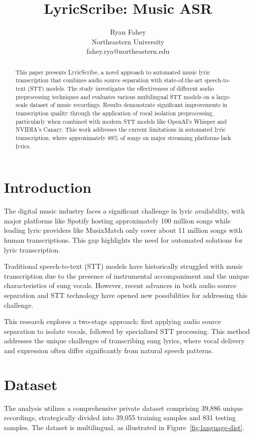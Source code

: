 \documentclass[10pt]{article}
\title{\textbf{LyricScribe: Music ASR}}
\author{Ryan Fahey\\
\small{Northeastern University}\\
\small{fahey.rya@northeastern.edu}}
\date{}
\begin{document}
\maketitle

\begin{abstract}
\noindent This paper presents LyricScribe, a novel approach to automated music lyric transcription that combines audio source separation with state-of-the-art speech-to-text (STT) models. The study investigates the effectiveness of different audio preprocessing techniques and evaluates various multilingual STT models on a large-scale dataset of music recordings. Results demonstrate significant improvements in transcription quality through the application of vocal isolation preprocessing, particularly when combined with modern STT models like OpenAI's Whisper and NVIDIA's Canary. This work addresses the current limitations in automated lyric transcription, where approximately 89\% of songs on major streaming platforms lack lyrics.
\end{abstract}

\section{Introduction}
The digital music industry faces a significant challenge in lyric availability, with major platforms like Spotify hosting approximately 100 million songs while leading lyric providers like MusixMatch only cover about 11 million songs with human transcriptions. This gap highlights the need for automated solutions for lyric transcription.

Traditional speech-to-text (STT) models have historically struggled with music transcription due to the presence of instrumental accompaniment and the unique characteristics of sung vocals. However, recent advances in both audio source separation and STT technology have opened new possibilities for addressing this challenge.

This research explores a two-stage approach: first applying audio source separation to isolate vocals, followed by specialized STT processing. This method addresses the unique challenges of transcribing sung lyrics, where vocal delivery and expression often differ significantly from natural speech patterns.

\section{Dataset}
The analysis utilizes a comprehensive private dataset comprising 39,886 unique recordings, strategically divided into 39,055 training samples and 831 testing samples. The dataset is multilingual, as illustrated in Figure~\ref{fig:language-dist}.
\end{document}
